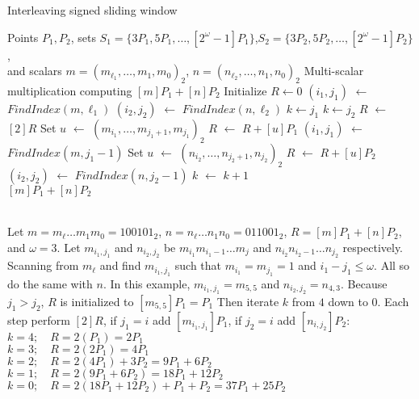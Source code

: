 \begin{algorithm}
\caption{Interleaving signed sliding window}
\begin{algorithmic}
	\Require Points $P_1,P_2$, sets $S_1=\{3P_1,5P_1,\dots,[2^{\omega}-1]P_1\}$,$S_2=\{3P_2,5P_2,\dots,[2^{\omega}-1]P_2\}$, \\
		and scalars $m={(m_{\ell_1},\dots,m_1,m_0)}_2$, $n={(n_{\ell_2},\dots,n_1,n_0)}_2$
	\Ensure Multi-scalar multiplication computing $[m]P_1 + [n]P_2$
	\Statex
	\State Initialize $R \gets 0$
	\State $(i_1,j_1)$ $\gets$ $FindIndex(m,\ell_1)$		
	\State $(i_2,j_2)$ $\gets$ $FindIndex(n,\ell_2)$
	 \State $k \gets j_1$
	\Else \State $k \gets j_2$
	\EndIf
				
		\State $R$ $\gets$ $[2]R$
			\State Set $u$ $\gets$ ${(m_{i_1},\dots,m_{j_1+1},m_{j_1})}_2$
			\State $R$ $\gets$ $R + [u]P_1$		
			\State $(i_1,j_1)$ $\gets$ $FindIndex(m,j_1{-}1)$
		\EndIf
			\State Set $u$ $\gets$ ${(n_{i_2},\dots,n_{j_2+1},n_{j_2})}_2$
			\State $R$ $\gets$ $R + [u]P_2$		
			\State $(i_2,j_2)$ $\gets$ $FindIndex(n,j_2{-}1)$
		\EndIf
		\State $k$ $\gets$ $k + 1$
	\EndWhile
	\\ \Return $[m]P_1 + [n]P_2$
\end{algorithmic}
\label{interleaveSlidingAlgo}
\end{algorithm}

 \\
Let $m = m_\ell \dots m_1 m_0 = {100101}_2$, $n = n_\ell \dots n_1 n_0 = {011001}_2$, $R = [m]P_1 + [n]P_2$, and $\omega = 3$.
Let $m_{i_1,j_1}$ and $n_{i_2,j_2}$ be $m_{i_1} m_{i_1-1} \dots m_{j}$ and $n_{i_2} n_{i_2-1} \dots n_{j_2}$ respectively.
Scanning from $m_\ell$ and find $m_{i_1,j_1}$ such that $m_{i_1} = m_{j_1} = 1$ and $i_1 - j_1 \le \omega$.
All so do the same with $n$.
In this example, $m_{i_1,j_1} = m_{5,5}$ and $n_{i_2,j_2} = n_{4,3}$.
Because $j_1 > j_2$, $R$ is initialized to $[m_{5,5}]P_1 = P_1$
Then iterate $k$ from $4$ down to $0$.
Each step perform $[2]R$, if $j_1 = i$ add $[m_{i_1,j_1}]P_1$, if $j_2 = i$ add $[n_{i,j_2}]P_2$: \\
$k=4; \quad R = 2(P_1) = 2P_1$ \\
$k=3; \quad R = 2(2P_1)= 4P_1$ \\
$k=2; \quad R = 2(4P_1) + 3P_2 = 9P_1 + 6P_2$ \\
$k=1; \quad R = 2(9P_1 + 6P_2) = 18P_1 + 12P_2$ \\
$k=0; \quad R = 2(18P_1 + 12P_2) + P_1 + P_2 = 37P_1 + 25P_2$ \\


